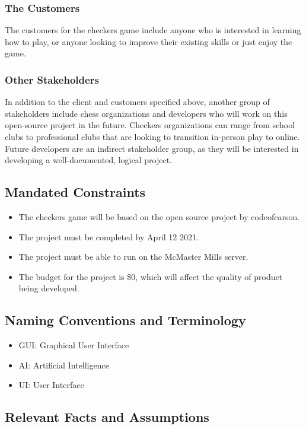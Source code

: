 \documentclass[12pt, titlepage]{article}
\begin{document}
\subsubsection{The Customers}
The customers for the checkers game include anyone who is interested in learning how to play, or anyone looking to improve their existing skills or just enjoy the game.

\subsubsection{Other Stakeholders}
In addition to the client and customers specified above, another group of stakeholders include chess organizations and developers who will work on this open-source project in the future. Checkers organizations can range from school clubs to professional clubs that are looking to transition in-person play to online. Future developers are an indirect stakeholder group, as they will be interested in developing a well-documented, logical project.

\subsection{Mandated Constraints}
\begin{itemize}
    \item The checkers game will be based on the open source project by codeofcarson.
    \item The project must be completed by April 12 2021.
    \item The project must be able to run on the McMaster Mills server.
    \item The budget for the project is \$0, which will affect the quality of product being developed.
\end{itemize}
\subsection{Naming Conventions and Terminology}
\begin{itemize}
    \item GUI: Graphical User Interface
    \item AI: Artificial Intelligence
    \item UI: User Interface
\end{itemize}

\subsection{Relevant Facts and Assumptions}
\end{document}
